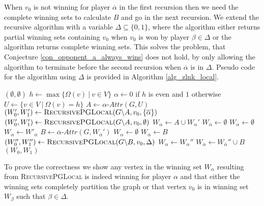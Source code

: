 When $v_0$ is not winning for player $\overline{\alpha}$ in the first recursion then we need the complete winning sets to calculate $B$ and go in the next recursion. We extend the recursive algorithm with a variable $\Delta \subseteq \{0,1\}$, where the algorithm either returns partial winning sets containing $v_0$ when $v_0$ is won by player $\beta\in \Delta$ or the algorithm returns complete winning sets. This solves the problem, that Conjecture \ref{con_opponent_a_always_wins} does not hold, by only allowing the algorithm to terminate before the second recursion when $\overline{\alpha}$ is in $\Delta$. Pseudo code for the algorithm using $\Delta$ is provided in Algorithm \ref{alg_zlnk_local}.
\begin{algorithm}
	\caption{$\textsc{RecursivePGLocal}(\textit{parity game } G = (V,V_0,V_1, E, \Omega),v_0,\Delta)$}
	\label{alg_zlnk_local}
	\begin{algorithmic}[1]
			\State \Return $(\emptyset, \emptyset)$
		\EndIf
		\State $h \gets\max\{ \Omega(v)\ |\ v \in V\}$
		\State $\alpha \gets 0$ if $h$ is even and $1$ otherwise
		\State $U \gets \{v \in V\ |\ \Omega(v) = h\}$
		\State $A \gets \alpha\textit{-Attr}(G, U)$
		\If{$\overline{\alpha} \in \Delta$}\label{line:recursivePGLocal:firstif}
		\State $(W_0', W_1') \gets \textsc{RecursivePGLocal}(G \backslash A,v_0,\{\overline{\alpha}\})$
		\Else
		\State $(W_0', W_1') \gets \textsc{RecursivePGLocal}(G \backslash A,v_0,\emptyset)$
		\EndIf
		\label{line:recursivePGLocal:emptywinif}
		\State $W_\alpha \gets A \cup W_\alpha'$
		\State $W_{\overline{\alpha}} \gets \emptyset$
		\Else
		\label{line:recursivePGLocal:v0inWopponentalpha}
		\State $W_\alpha \gets \emptyset$
		\State $W_{\overline{\alpha}} \gets W'_{\overline{\alpha}}$
		\Else
		\State $B \gets \overline{\alpha}\textit{-Attr}(G,W_{\overline{\alpha}}')$
		\label{line:recursivePGLocal:v0inB}
		\State $W_\alpha \gets \emptyset$
		\State $W_{\overline{\alpha}} \gets B$
		\Else
		\State $(W_0'', W_1'') \gets \textsc{RecursivePGLocal}(G \backslash B,v_0,\Delta)$
		\State $W_\alpha \gets W_\alpha''$
		\State $W_{\overline{\alpha}} \gets W_{\overline{\alpha}}'' \cup B$
		\EndIf
		\EndIf
		\EndIf
		\State \Return $(W_0, W_1)$
	\end{algorithmic}
\end{algorithm}

To prove the correctness we show any vertex in the winning set $W_\alpha$ resulting from \textsc{RecursivePGLocal} is indeed winning for player $\alpha$ and that either the winning sets completely partition the graph or that vertex $v_0$ is in winning set $W_\beta$ such that $\beta \in \Delta$.

